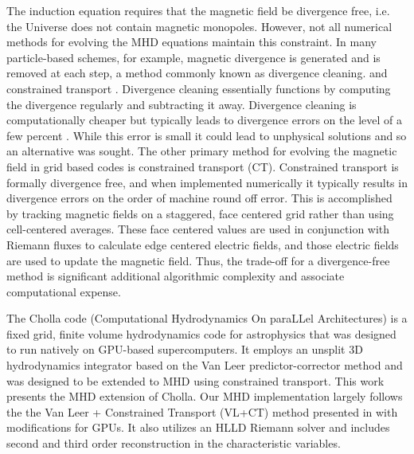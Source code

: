 The induction equation requires that the magnetic field be divergence free, i.e. the Universe does not contain magnetic monopoles. However, not all numerical methods for evolving the MHD equations maintain this constraint. In many particle-based schemes, for example, magnetic divergence is generated and is removed at each step, a method commonly known as divergence cleaning\citep{dedner_hyperbolic_2002}. and constrained transport \citep{evans_1988}. Divergence cleaning essentially functions by computing the divergence regularly and subtracting it away. Divergence cleaning is computationally cheaper but typically leads to divergence errors on the level of a few percent \citep{pakmor_magnetizing_2020,van_de_voort_effect_2021}. While this error is small it could lead to unphysical solutions and so an alternative was sought. The other primary method for evolving the magnetic field in grid based codes is constrained transport (CT). Constrained transport is formally divergence free, and when implemented numerically it typically results in divergence errors on the order of machine round off error\citep{evans_1988,stone_athena_2008, stone_2009}. This is accomplished by tracking magnetic fields on a staggered, face centered grid rather than using cell-centered averages. These face centered values are used in conjunction with Riemann fluxes to calculate edge centered electric fields, and those electric fields are used to update the magnetic field\citep{evans_1988,stone_athena_2008, stone_2009}. Thus, the trade-off for a divergence-free method is significant additional algorithmic complexity and associate computational expense.

The Cholla code (Computational Hydrodynamics On paraLLel Architectures)\citep{schneider_2015} is a fixed grid, finite volume hydrodynamics code for astrophysics that was designed to run natively on GPU-based supercomputers. It employs an unsplit 3D hydrodynamics integrator based on the Van Leer predictor-corrector method \citep{falle_1991, van_leer_2003} and was designed to be extended to MHD using constrained transport\citep{evans_1988, stone_athena_2008}. This work presents the MHD extension of Cholla. Our MHD implementation largely follows the the Van Leer + Constrained Transport (VL+CT) method presented in \cite{stone_2009} with modifications for GPUs. It also utilizes an HLLD Riemann solver\citep{hlld_2005} and includes second\citep{stone_2009} and third\citep{felker_2018} order reconstruction in the characteristic variables\citep{stone_athena_2008}.

